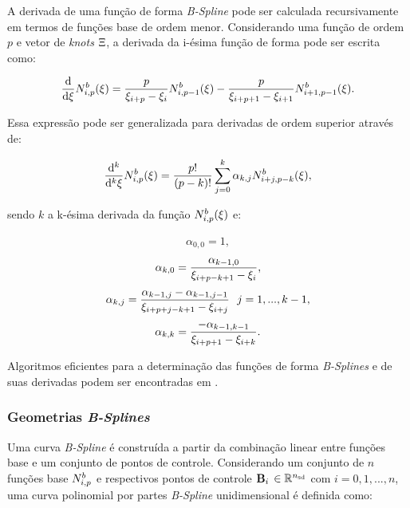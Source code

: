 \documentclass[tese_patricia]{subfiles}
\begin{document}
A derivada de uma função de forma \textit{B-Spline} pode ser calculada recursivamente em termos de funções base de ordem menor. Considerando uma função de ordem $p$ e vetor de \textit{knots} $\Xi$, a derivada da i-ésima função de forma pode ser escrita como:

\begin{align}
\frac{\mathrm{d}}{\mathrm{d} \xi} N^b_{i,p}(\xi) = \frac{p}{\xi_{i+p} - \xi_{i}}N^b_{i,p-1}(\xi) - \frac{p}{\xi_{i+p+1} - \xi_{i+1}}N^b_{i+1,p-1}(\xi).
\end{align}

Essa expressão pode ser generalizada para derivadas de ordem superior através de:

\begin{align}
	\frac{\mathrm{d}^{k}}{\mathrm{d}^{k} \xi} N^b_{i,p}(\xi) = \frac{p!}{\left(p-k\right)!} \sum_{j=0}^{k}{\alpha_{k,j}N^b_{i+j,p-k}(\xi)},
\end{align}

sendo $k$ a k-ésima derivada da função $N^b_{i,p}(\xi)$ e:

\begin{align}
	\alpha_{0,0} = 1,
\end{align}
\begin{align}
	\alpha_{k,0} = \frac{\alpha_{k-1,0}}{\xi_{i+p-k+1}-\xi_{i}},
\end{align}
\begin{align}
	\alpha_{k,j} = \frac{\alpha_{k-1,j}-\alpha_{k-1,j-1}}{\xsi_{i+p+j-k+1}-\xsi_{i+j}} \ \ j=1,...,k-1,
\end{align}
\begin{align}
	\alpha_{k,k} = \frac{-\alpha_{k-1,k-1}}{\xi_{i+p+1}-\xi_{i+k}}.
\end{align}

Algoritmos eficientes para a determinação das funções de forma \textit{B-Splines} e de suas derivadas podem ser encontradas em .

\subsubsection{Geometrias \textit{B-Splines}}

Uma curva \textit{B-Spline} é construída a partir da combinação linear entre funções base e um conjunto de pontos de controle. Considerando um conjunto de $n$ funções base $N^b_{i,p}$ e respectivos pontos de controle $\mathbf{B}_i$ $\in \mathbb{R}^{{n_{\mathrm{sd}}}}$ com $i = 0,1,...,n$,
uma curva polinomial por partes \textit{B-Spline} unidimensional é definida como:
\end{document}
